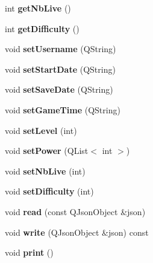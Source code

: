 \begin{DoxyCompactItemize}
\item 
\hypertarget{class_profil_a4747a4a9cf7d22203bc316f3a0753033}{}int {\bfseries get\+Nb\+Live} ()\label{class_profil_a4747a4a9cf7d22203bc316f3a0753033}

\item 
\hypertarget{class_profil_a10c2f4863000e5525f8504a22ccf1260}{}int {\bfseries get\+Difficulty} ()\label{class_profil_a10c2f4863000e5525f8504a22ccf1260}

\item 
\hypertarget{class_profil_a23d36025cd3b9ad9ff128021b16c2431}{}void {\bfseries set\+Username} (Q\+String)\label{class_profil_a23d36025cd3b9ad9ff128021b16c2431}

\item 
\hypertarget{class_profil_a3d6b5ead3c4e6af1aa3f4035fb3dd624}{}void {\bfseries set\+Start\+Date} (Q\+String)\label{class_profil_a3d6b5ead3c4e6af1aa3f4035fb3dd624}

\item 
\hypertarget{class_profil_a484838bb61b18b3c82fede9aaad41b35}{}void {\bfseries set\+Save\+Date} (Q\+String)\label{class_profil_a484838bb61b18b3c82fede9aaad41b35}

\item 
\hypertarget{class_profil_a2c9a526c1a26cb8b91c20a3a6df0ccc6}{}void {\bfseries set\+Game\+Time} (Q\+String)\label{class_profil_a2c9a526c1a26cb8b91c20a3a6df0ccc6}

\item 
\hypertarget{class_profil_a7edbce434f4b1c1bf1d98b704fcc650e}{}void {\bfseries set\+Level} (int)\label{class_profil_a7edbce434f4b1c1bf1d98b704fcc650e}

\item 
\hypertarget{class_profil_a1322566ebccffe1636df61c9bc74695d}{}void {\bfseries set\+Power} (Q\+List$<$ int $>$)\label{class_profil_a1322566ebccffe1636df61c9bc74695d}

\item 
\hypertarget{class_profil_ae8d5b07cd8bd4d8ad2a1e1b431056a0f}{}void {\bfseries set\+Nb\+Live} (int)\label{class_profil_ae8d5b07cd8bd4d8ad2a1e1b431056a0f}

\item 
\hypertarget{class_profil_ab4c02fb71667985e9e9ffe991ea6b824}{}void {\bfseries set\+Difficulty} (int)\label{class_profil_ab4c02fb71667985e9e9ffe991ea6b824}

\item 
\hypertarget{class_profil_ab834326ebb9864fca5aec8020d0ad6f8}{}void {\bfseries read} (const Q\+Json\+Object \&json)\label{class_profil_ab834326ebb9864fca5aec8020d0ad6f8}

\item 
\hypertarget{class_profil_a0c07c8aaf3e8b1fee2aeb5ee226f4206}{}void {\bfseries write} (Q\+Json\+Object \&json) const \label{class_profil_a0c07c8aaf3e8b1fee2aeb5ee226f4206}

\item 
\hypertarget{class_profil_a6c2dd8fc5f5604ce12959982309eed42}{}void {\bfseries print} ()\label{class_profil_a6c2dd8fc5f5604ce12959982309eed42}

\end{DoxyCompactItemize}
